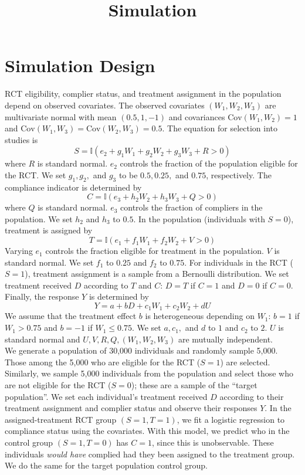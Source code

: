 \documentclass{article}
\title{Simulation}
\newcommand{\ind}{\mathbb{I}} %
\newcommand{\cov}{\textrm{Cov}}
\theoremstyle{plain}
\begin{document}
\maketitle


\section{Simulation Design}
RCT eligibility, complier status, and treatment assignment in the population depend on observed covariates. 
The observed covariates $(W_1, W_2, W_3)$ are multivariate normal with mean $(0.5, 1, -1)$ and covariances $\cov(W_1, W_2) = 1$ and $\cov(W_1, W_3) = \cov(W_2, W_3) = 0.5$. 
 The  equation for selection into studies is
 $$ S = \ind(e_2 + g_1W_1 + g_2W_2 + g_3W_3 + R > 0)$$
  where $R$ is standard normal. $e_2$ controls the fraction of the population eligible for the RCT. We set $g_1, g_2,$ and $g_3$ to be $0.5, 0.25,$ and $0.75$, respectively.
The compliance indicator is determined by
$$C = \ind(e_3 + h_2W_2 + h_3W_3 + Q > 0)$$
where $Q$ is standard normal. $e_3$ controls the fraction of compliers in the population. We set $h_2$ and $h_3$ to $0.5$.
 In the population (individuals with $S=0$),  treatment is assigned by
  $$T = \ind(e_1 + f_1W_1 + f_2W_2 + V > 0)$$
Varying $e_1$ controls the fraction eligible for treatment in the population. $V$ is standard normal. We set $f_1$ to $0.25$ and $f_2$ to $0.75$.  For individuals in the RCT ($S=1$), treatment assignment is a sample from a Bernoulli distribution.
We set treatment received $D$ according to $T$ and $C$: $D = T$ if $C=1$ and $D = 0$ if $C=0$.
Finally, the response $Y$ is determined by 
$$Y = a + bD + c_1W_1 + c_2W_2 + dU$$
 We assume that the treatment effect $b$ is heterogeneous depending on $W_1$: $b = 1$ if $W_1 > 0.75$ and $b=-1$ if $W_1 \leq 0.75$.   We set $a, c_1,$ and $d$ to $1$ and $c_2$ to $2$. $U$ is standard normal and $U, V, R, Q, (W_1, W_2, W_3)$ are mutually independent.\\
 
 We generate a population of 30,000 individuals and randomly sample 5,000.  Those among the 5,000 who are eligible for the RCT ($S=1$) are selected. Similarly, we sample 5,000 individuals from the population and select those who are not eligible for the RCT ($S=0$); these are a sample of the ``target population''.  We set each individual's treatment received $D$ according to their treatment assignment and complier status and observe their responses $Y$.  In the assigned-treatment RCT group $(S = 1, T = 1)$, we fit a logistic regression to compliance status using the covariates.  With this model, we predict who in the control group $(S = 1, T = 0)$ has $C=1$, since this is unobservable.  These individuals \textit{would have} complied had they been assigned to the treatment group.  We do the same for the target population control group.  \\
 
\end{document}
